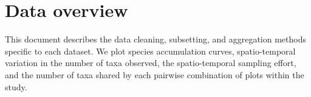 \documentclass[11pt, oneside]{article}
\begin{document}
\section {Data overview}
This document  describes the data cleaning, subsetting, and aggregation methods specific to each dataset.
We plot species accumulation curves, spatio-temporal variation in the number of taxa observed, the spatio-temporal sampling effort, and the number of taxa shared by each pairwise combination of plots within the study.
\end{document}
